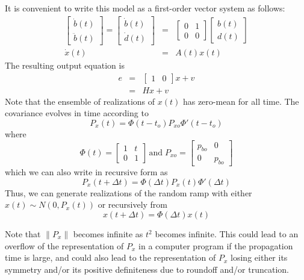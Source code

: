 It is convenient to write this model as a first-order vector system as follows:
\begin{eqnarray}
	\begin{bmatrix} \dot{b}(t) \\ \ddot{b}(t) \end{bmatrix} =
	\begin{bmatrix} \dot{b}(t) \\ \dot{d}(t) \end{bmatrix} &=&
	\begin{bmatrix} 0 & 1 \\ 0 & 0 \end{bmatrix}
	\begin{bmatrix} b(t) \\ d(t) \end{bmatrix} \\
	\dot{x}(t) &=& A(t) x(t)
\end{eqnarray}
The resulting output equation is
\begin{eqnarray}
	e & = &  \begin{bmatrix} 1 & 0 \end{bmatrix} x + v \\
	& = & H x + v
\end{eqnarray}
Note that the ensemble of realizations of $x(t)$ has zero-mean for all time.  The covariance evolves in time according to
\begin{equation}
	P_x(t) = \Phi(t-t_o)P_{xo}\Phi'(t-t_o)
\end{equation}
where
\begin{equation}
	\Phi(t) = \begin{bmatrix} 1 & t \\ 0 & 1 \end{bmatrix} \, \text{and} \;
	P_{xo} = \begin{bmatrix} p_{bo} & 0 \\ 0 & p_{\dot{b}o} \end{bmatrix}
\end{equation}
which we can also write in recursive form as
\begin{equation}
	P_x(t+\Delta t) = \Phi(\Delta t)P_x(t)\Phi'(\Delta t)
\end{equation}
Thus, we can generate realizations of the random ramp with either $x(t) \sim N(0, P_x(t))$ or recursively from
\begin{equation}
	x(t+\Delta t) = \Phi(\Delta t) x(t)
\end{equation}

Note that $\|P_x\|$ becomes infinite as $t^2$ becomes infinite.  This could lead to an overflow of the representation of $P_x$ in a computer program if the propagation time is large, and could also lead to the representation of $P_x$ losing either its symmetry and/or its positive definiteness due to roundoff and/or truncation.

